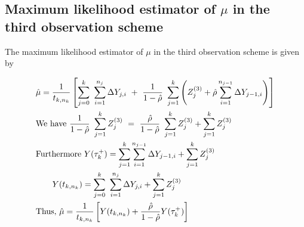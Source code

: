\begin{appendices}
\section{Maximum likelihood estimator of $\mu$ in the third observation scheme}
\label{appendix:mle_mu3}

The maximum likelihood estimator of $\mu$ in the third observation scheme is given by  

\begin{align*}
&\hat{\mu} = \frac{1}{t_{k,n_{k}}} \left[ \sum\limits_{j=0}^{k}\ \sum\limits_{i=1}^{n_j}\Delta Y_{j,i}\ +\ \frac{1}{1-\hat{\rho}}\ \sum\limits_{j=1}^{k} \left(Z_j^{(3)}+\hat{\rho} \sum \limits_{i=1}^{n_{j-1}}\Delta Y_{j-1,i}\right)\right]\\
&\text{We have }\frac{1}{1-\hat{\rho}}\ \sum\limits_{j=1}^{k} Z_j^{(3)}\ =\ \frac{\hat\rho}{1-\hat{\rho}}\ \sum\limits_{j=1}^{k} Z_j^{(3)} +\sum\limits_{j=1}^{k} Z_j^{(3)} \\
&\text{Furthermore }Y(\tau_k^+)= \sum\limits_{j=1}^{k} \sum \limits_{i=1}^{n_{j-1}}\Delta Y_{j-1,i} + \sum\limits_{j=1}^{k} Z_j^{(3)} \\
&\hspace{7mm} Y(t_{k,n_k})=\sum\limits_{j=0}^{k}\ \sum\limits_{i=1}^{n_j}\Delta Y_{j,i} + \sum\limits_{j=1}^{k} Z_j^{(3)}\\
&\text{Thus, } \hat\mu=\frac{1}{t_{k,n_k}} \left[Y(t_{k,n_k})+\frac{\hat\rho}{1-\hat\rho}Y(\tau_k^+)\right]
\end{align*}

\end{appendices}

%










